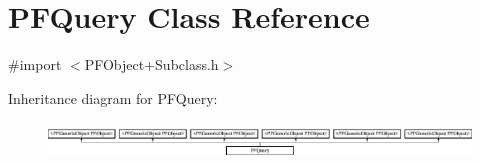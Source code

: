 \hypertarget{class_p_f_query}{}\section{P\+F\+Query Class Reference}
\label{class_p_f_query}


{\ttfamily \#import $<$P\+F\+Object+\+Subclass.\+h$>$}

Inheritance diagram for P\+F\+Query\+:\begin{figure}[H]
\begin{center}
\leavevmode
\includegraphics[height=0.982456cm]{class_p_f_query}
\end{center}
\end{figure}
